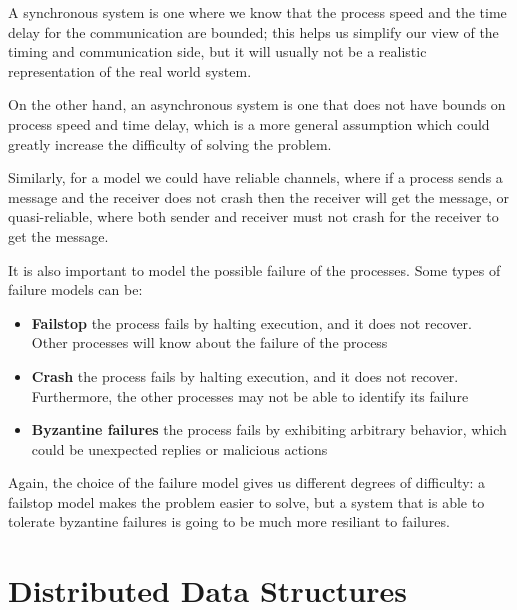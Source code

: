 A synchronous system is one where we know that the process speed and the time delay for the communication are bounded; this helps us simplify our view of the timing and communication side, but it will usually not be a realistic representation of the real world system.

On the other hand, an asynchronous system is one that  does not have bounds on process speed and time delay, which is a more general assumption which could greatly increase the difficulty of solving the problem.

Similarly, for a model we could have reliable channels, where if a process sends a message and the receiver does not crash then the receiver will get the message, or quasi-reliable, where both sender and receiver must not crash for the receiver to get the message.

It is also important to model the possible failure of the processes. 
Some types of failure models can be:
\begin{itemize}
\item \textbf{Failstop} the process fails by halting execution, and it does not recover. Other processes will know about the failure of the process
\item \textbf{Crash} the process fails by halting execution, and it does not recover. Furthermore, the other processes may not be able to identify its failure
\item \textbf{Byzantine failures} the process fails by exhibiting arbitrary behavior, which could be unexpected replies or malicious actions
\end{itemize}

Again, the choice of the failure model gives us different degrees of difficulty: a failstop model makes the problem easier to solve, but a system that is able to tolerate byzantine failures is going to be much more resiliant to failures.

\section{Distributed Data Structures}\label{sec:distributed-data-structures}

